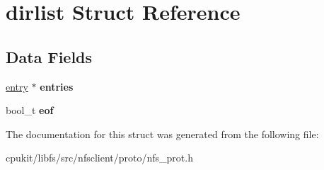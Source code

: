 \hypertarget{structdirlist}{}\section{dirlist Struct Reference}
\label{structdirlist}
\subsection*{Data Fields}
\begin{DoxyCompactItemize}
\item 
\mbox{\label{structdirlist_ac8daff7dedaad2cf84622d728ef688f8}} 
\mbox{\hyperlink{structentry}{entry}} $\ast$ {\bfseries entries}
\item 
\mbox{\label{structdirlist_a34b30e003b8f86b3c3a4ad415aff8c56}} 
bool\+\_\+t {\bfseries eof}
\end{DoxyCompactItemize}


The documentation for this struct was generated from the following file\+:\begin{DoxyCompactItemize}
\item 
cpukit/libfs/src/nfsclient/proto/nfs\+\_\+prot.\+h\end{DoxyCompactItemize}
